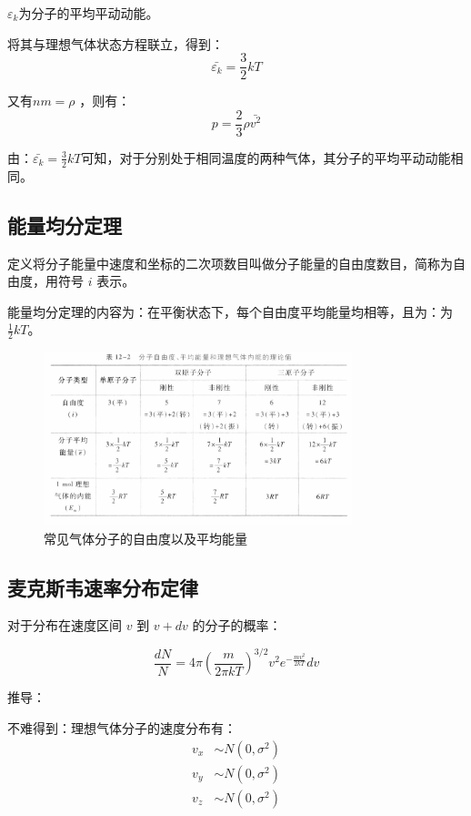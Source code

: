 \documentclass[10pt]{ctexart}
\begin{document}
$\varepsilon_k$为分子的平均平动动能。

将其与理想气体状态方程联立，得到：
$$
    \bar{\varepsilon_k} = \frac{3}{2} k T
$$

又有$ n m = \rho $ ，则有：
$$
    p = \frac{2}{3} \rho \bar{v^2}
$$

由：$\bar{\varepsilon_k} = \frac{3}{2} k T$可知，对于分别处于相同温度的两种气体，其分子的平均平动动能相同。

\subsection{能量均分定理}
\label{subsec:能量均分定理}

定义将分子能量中速度和坐标的二次项数目叫做分子能量的自由度数目，简称为自由度，用符号 $i$ 表示。

能量均分定理的内容为：在平衡状态下，每个自由度平均能量均相等，且为：为 $\frac{1}{2} k T$。

\begin{figure}[H]
    \centering
    \includegraphics[width=0.8\textwidth]{img/12/2.png}
    \caption{常见气体分子的自由度以及平均能量}
\end{figure}

\subsection{麦克斯韦速率分布定律}
\label{subsec:麦克斯韦速率分布定律}

对于分布在速度区间 $v$ 到 $v + d v$ 的分子的概率：

$$
    \frac{d N}{N} = 4 \pi \left( \frac{m}{2 \pi k T} \right)^{3/2} v^2 e^{-\frac{m v^2}{2 k T}} d v
$$

推导：

不难得到：理想气体分子的速度分布有：
\begin{align*}
    v_x &\sim N(0, \sigma^2) \\
    v_y &\sim N(0, \sigma^2) \\
    v_z &\sim N(0, \sigma^2)
\end{align*}
\end{document}
